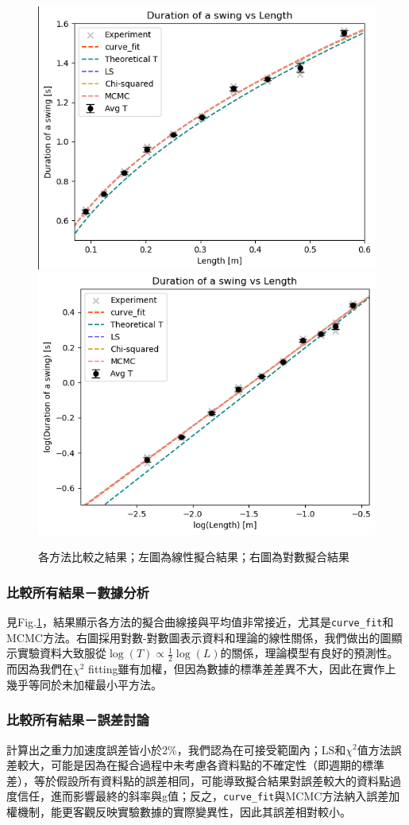 \documentclass[12pt,a4paper]{article}
\begin{document}
\begin{CJK}{UTF8}{bkai}
\begin{figure}[h]
    \centering    \includegraphics[width=0.45\linewidth]{CAMA.png} \includegraphics[width=0.45\linewidth]{CAMB.png}
    \caption{各方法比較之結果；左圖為線性擬合結果；右圖為對數擬合結果}
    \label{fig:CAM}
\end{figure}

\clearpage

\subsubsection{比較所有結果－數據分析}
\hfill

\indent 見Fig.\ref{fig:CAM}，結果顯示各方法的擬合曲線接與平均值非常接近，尤其是\texttt{curve\_fit}和MCMC方法。右圖採用對數-對數圖表示資料和理論的線性關係，我們做出的圖顯示實驗資料大致服從$\log(T)\propto \frac{1}{2}\log(L) $的關係，理論模型有良好的預測性。\\
\indent 而因為我們在$\chi^2$ fitting雖有加權，但因為數據的標準差差異不大，因此在實作上幾乎等同於未加權最小平方法。

\subsubsection{比較所有結果－誤差討論}
\hfill

\indent 計算出之重力加速度誤差皆小於2\%，我們認為在可接受範圍內；LS和$\chi^2$值方法誤差較大，可能是因為在擬合過程中未考慮各資料點的不確定性（即週期的標準差），等於假設所有資料點的誤差相同，可能導致擬合結果對誤差較大的資料點過度信任，進而影響最終的斜率與g值；反之，\texttt{curve\_fit}與MCMC方法納入誤差加權機制，能更客觀反映實驗數據的實際變異性，因此其誤差相對較小。


\end{CJK}
\end{document}
